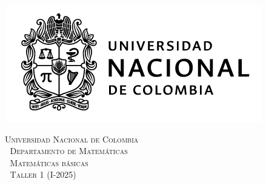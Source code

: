 \noindent
\begin{minipage}{0.3\textwidth}
  \includegraphics[scale=0.35]{logounal.png}
\end{minipage}%
\hfill
\begin{minipage}{0.65\textwidth}
  \begin{center}
    \scshape
    \Large \textsc{Universidad Nacional de Colombia} \\
    \textcolor{white}{\tiny.} \Large \textsc{Departamento de Matemáticas} \\
    \textcolor{white}{\tiny.} \large \textsc{Matemáticas básicas} \\
    \textcolor{white}{\tiny.} \large \textsf{Taller 1} \normalsize (I-2025)
  \end{center}
\end{minipage}